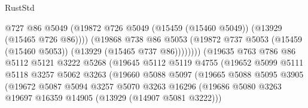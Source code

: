 \begin{lexlean}{RustStd}
\begin{coremodule}
                                        @727
                                        @86
                                        @5049
                                        (@19872
                                          @726
                                          @5049
                                          (@15459 (@15460 @5049))
                                          (@13929 (@15465 @726 @86))))
                                      (@19868
                                        @738
                                        @86
                                        @5053
                                        (@19872
                                          @737
                                          @5053
                                          (@15459 (@15460 @5053))
                                          (@13929 (@15465 @737 @86))))))))
                              (@19635
                                @763
                                @786
                                @86
                                @5112
                                @5121
                                @3222
                                @5268
                                (@19645
                                  @5112
                                  @5119
                                  @4755
                                  (@19652
                                    @5099
                                    @5111
                                    @5118
                                    @3257
                                    @5062
                                    @3263
                                    (@19660
                                      @5088
                                      @5097
                                      (@19665
                                        @5088
                                        @5095
                                        @3905
                                        (@19672
                                          @5087
                                          @5094
                                          @3257
                                          @5070
                                          @3263
                                          @16296
                                          (@19686
                                            @5080
                                            @3263
                                            @19697
                                            @16359
                                            @14905
                                            (@13929 (@14907 @5081 @3222)))

\end{coremodule}
\end{lexlean}
